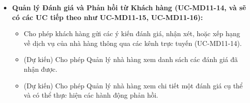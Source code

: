 \begin{itemize}
    \item \textbf{Quản lý Đánh giá và Phản hồi từ Khách hàng (UC-MD11-14, và sẽ có các UC tiếp theo như UC-MD11-15, UC-MD11-16):}
    \begin{itemize}
        \item Cho phép khách hàng gửi các ý kiến đánh giá, nhận xét, hoặc xếp hạng về dịch vụ của nhà hàng thông qua các kênh trực tuyến (UC-MD11-14).
        \item (Dự kiến) Cho phép Quản lý nhà hàng xem danh sách các đánh giá đã nhận được.
        \item (Dự kiến) Cho phép Quản lý nhà hàng xem chi tiết một đánh giá cụ thể và có thể thực hiện các hành động phản hồi.
    \end{itemize}
\end{itemize}

